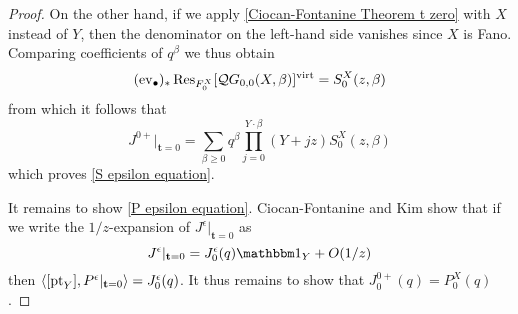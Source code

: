 \begin{proof}
On the other hand, if we apply \eqref{Ciocan-Fontanine Theorem t zero} with $X$ instead of $Y$, then the denominator on the left-hand side vanishes since $X$ is Fano. Comparing coefficients of $q^\beta$ we thus obtain
\begin{equation*} (\operatorname{ev}_{\bullet})_* \operatorname{Res}_{F_0^X}[\mathcal{Q}G_{0,0}(X,\beta)]^{\operatorname{virt}} = S_0^X(z,\beta) \end{equation*}
from which it follows that
\begin{equation*} J^{0+}|_{\mathbf{t}=0} = \sum_{\beta \geq 0} q^\beta \prod_{j=0}^{Y\cdot\beta}(Y+jz) S_0^X(z,\beta)\end{equation*}
which proves \eqref{S epsilon equation}.

It remains to show \eqref{P epsilon equation}. Ciocan-Fontanine and Kim  show that if we write the $1/z$-expansion of ${J^{\epsilon}}|_{\mathbf{t}=0}$ as
\begin{equation*} {J^{\epsilon}}|_{\mathbf{t}=0}=J^{\epsilon}_{0}(q)\mathbbm 1_Y+O(1/z) \end{equation*}
then $\langle [\operatorname{pt}_Y],  P^\epsilon|_{{\bf t}=0}\rangle=J^{\epsilon}_{0}(q)$. It thus remains to show that $J^{0+}_0(q)=P_0^X(q)$.


\end{proof}
